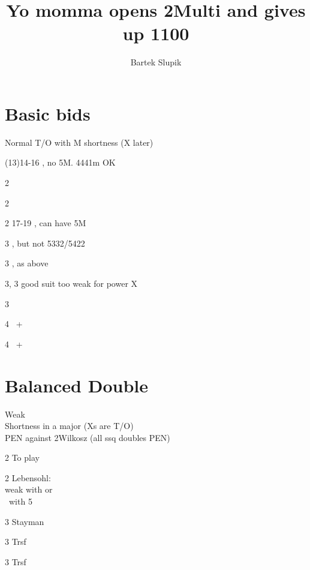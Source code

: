 \documentclass[12pt, a4paper]{article}
\title{Yo momma opens 2\diams Multi and gives up 1100}
\date{}
\author{Bartek Slupik}
\begin{document}
\maketitle
\section*{Basic bids}
\compsequence{{2\diams\alrt}}
\begin{compoptions}[2]
    \item[\pass] Normal T/O with M shortness (X later)
    \item[\dbl](13)14-16 \bal, no 5M. 4441m OK \vimp
    \item[2\hearts] \hearts
    \item[2\spades] \spades
    \item[2\nt] 17-19 \bal, can have 5M \imp \br
    \item[3\clubs] \clubs, but not 5332/5422
    \item[3\diams] \diams, as above
    \item[3\hearts, 3\spades] good suit too weak for power X
    \item[3\nt] \minor \vimp
    \item[4\clubs] \clubs\ + \major
    \item[4\diams] \diams\ + \major
\end{compoptions}



\section*{Balanced Double}
\compsequence{{2\diams\alrt}{\dbl\alrt}{\rdbl\alrt}}
\begin{compoptions}[4]
    \item[\pass] Weak \\
                 Shortness in a major (Xs are T/O) \\
                 PEN against 2\diams Wilkosz (all ssq doubles PEN)
    \item[2\major] To play \br
    \item[2\nt] Lebensohl: \\ weak with \clubs or \diams \\ \inv\ with 5\major 
    \item[3\clubs] Stayman
    \item[3\diams\hearts] Trsf \gf
    \item[3\spades] Trsf \nt   
\end{compoptions}
\end{document}
